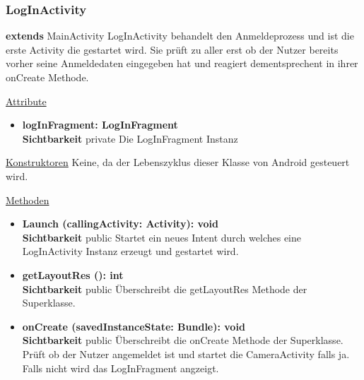 \subsubsection{LogInActivity}
\textbf{extends} MainActivity\newline
LogInActivity behandelt den Anmeldeprozess und ist die erste Activity die gestartet wird. Sie prüft zu aller erst ob der Nutzer bereits vorher seine Anmeldedaten eingegeben hat und reagiert dementsprechent in ihrer onCreate Methode.
\newline

\underline{Attribute}
\begin{itemize}
\itemsep0pt
\item \textbf{logInFragment: LogInFragment} \hfill\\ 
\textbf{Sichtbarkeit} private\newline
Die LogInFragment Instanz
\end{itemize}

\underline{Konstruktoren}\newline
\indent Keine, da der Lebenszyklus dieser Klasse von Android gesteuert wird.\newline

\underline{Methoden}
\begin{itemize}
\itemsep0pt

\item \textbf{Launch (callingActivity: Activity): void}\hfill\\
\textbf{Sichtbarkeit} public
Startet ein neues Intent durch welches eine LogInActivity Instanz erzeugt und gestartet wird.

\item \textbf{getLayoutRes (): int}\hfill\\
\textbf{Sichtbarkeit} public\newline
Überschreibt die getLayoutRes Methode der Superklasse.

\item \textbf{onCreate (savedInstanceState: Bundle): void}\hfill\\
\textbf{Sichtbarkeit} public\newline
Überschreibt die onCreate Methode der Superklasse. Prüft ob der Nutzer angemeldet ist und startet die CameraActivity falls ja. Falls nicht wird das LogInFragment angzeigt.

\end{itemize}
